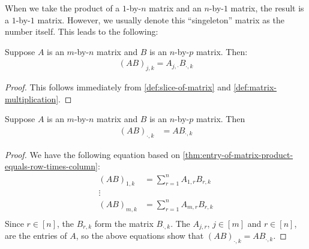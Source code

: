 \documentclass{article}
\begin{document}
When we take the product of a $1$-by-$n$ matrix and an $n$-by-$1$
matrix, the result is a $1$-by-$1$ matrix. However, we usually denote
this ``singeleton'' matrix as the number itself. This leads to the following:

\begin{theorem}
  \label{thm:entry-of-matrix-product-equals-row-times-column}
  Suppose $A$ is an $m$-by-$n$ matrix and $B$ is an $n$-by-$p$
  matrix. Then:
  \begin{align*}
    (AB)_{j,k} = A_{j, \cdot}B_{\cdot,k}
  \end{align*}
\end{theorem}
\begin{proof}
  This follows immediately from \cref{def:slice-of-matrix} and \cref{def:matrix-multiplication}.
\end{proof}

\begin{theorem}
  \label{thm:column-of-matrix-product-equals-matrix-times-column}
  Suppose $A$ is an $m$-by-$n$ matrix and $B$ is an $n$-by-$p$
  matrix. Then
  \begin{align*}
    (AB)_{\cdot,k} &= AB_{\cdot,k}
  \end{align*}
\end{theorem}
\begin{proof}
  We have the following equation based on
  \cref{thm:entry-of-matrix-product-equals-row-times-column}:
  \begin{align*}
    (AB)_{1,k} &= \sum_{r=1}^n A_{1,r}B_{r,k} \\
    \vdots \\
    (AB)_{m,k} &= \sum_{r=1}^n A_{m,r}B_{r,k} \\
  \end{align*}
  Since $r \in [n]$, the $B_{r, k}$ form the matrix $B_{\cdot,k}$. The
  $A_{j, r}$, $j \in [m]$ and $r \in [n]$, are the entries of $A$, so
  the above equations show that $(AB)_{\cdot,k} = AB_{\cdot,k}$.
\end{proof}
\end{document}
